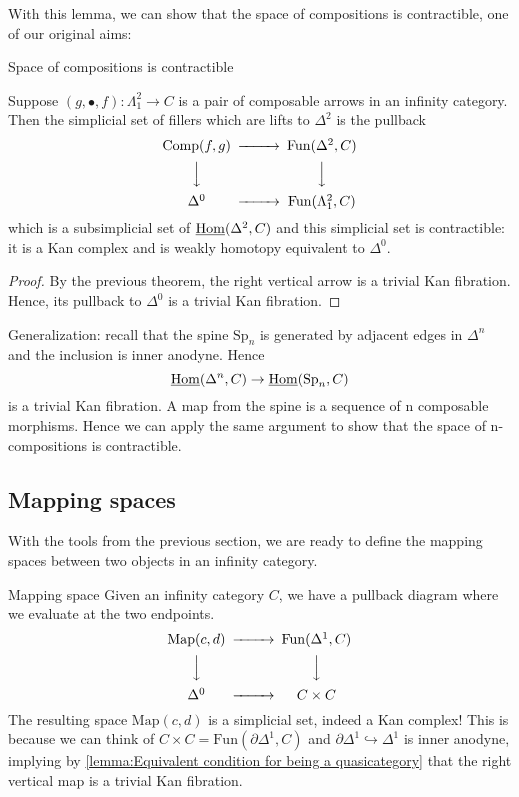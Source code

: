 With this lemma, we can show that the space of compositions is contractible, one of our original aims:

\begin{corollary}{Space of compositions is contractible}{}

Suppose $(g,\bullet,f):\Lambda^2_1\rightarrow C$ is a pair of composable arrows in an infinity category. Then the simplicial set of fillers which are lifts to $\Delta^2$ is the pullback $$\begin{CD} \mathrm{Comp}(f,g)@>>> \Fun(\Delta^2,C)\\ @VVV @VVV \\ \Delta^0 @>>> \Fun(\Lambda^2_1,C)\end{CD}$$
which is a subsimplicial set of $\underline{\operatorname{Hom}}(\Delta^2,C)$ and this simplicial set is contractible: it is a Kan complex and is weakly homotopy equivalent to $\Delta^0$. \end{corollary}
\begin{proof}
    By the previous theorem, the right vertical arrow is a trivial Kan fibration. Hence, its pullback to $\Delta^0$ is a trivial Kan fibration.
\end{proof}

Generalization: recall that the spine $\mathrm{Sp}_n$ is generated by adjacent edges in $\Delta^n$ and the inclusion is inner anodyne. Hence $$\underline{\operatorname{Hom}}(\Delta^n,C)\rightarrow \underline{\operatorname{Hom}}(\mathrm{Sp}_n,C)$$is a trivial Kan fibration. A map from the spine is a sequence of n composable morphisms. Hence we can apply the same argument to show that the space of n-compositions is contractible.

\subsection{Mapping spaces}
With the tools from the previous section, we are ready to define the mapping spaces between two objects in an infinity category.

\begin{definition}{Mapping space}{}
    Given an infinity category $C$, we have a pullback diagram where we evaluate at the two endpoints.  $$\begin{CD} \mathrm{Map}(c,d) @>>> \mathrm{Fun}(\Delta^1, C)\\ @VVV @VVV \\ \Delta^0 @>>> C\times C\end{CD}$$The resulting space $\mathrm{Map}(c,d)$ is a simplicial set, indeed a Kan complex! This is because we can think of $C\times C=\mathrm{Fun}(\partial \Delta^1, C)$ and $\partial \Delta^1 \hookrightarrow \Delta^1$ is inner anodyne, implying by \ref{lemma:Equivalent condition for being a quasicategory} that the right vertical map is a trivial Kan fibration.
\end{definition}


